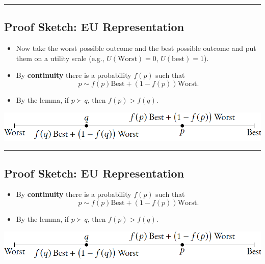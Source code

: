 \documentclass[
  letterpaper,
  DIV=11,
  numbers=noendperiod]{scrartcl}
\providecommand{\tightlist}{%
  \setlength{\itemsep}{0pt}\setlength{\parskip}{0pt}}\usepackage{longtable,booktabs,array}
\begin{document}
\begin{center}\rule{0.5\linewidth}{0.5pt}\end{center}

\subsection{Proof Sketch: EU
Representation}\label{proof-sketch-eu-representation-3}

\begin{itemize}
\tightlist
\item
  Now take the worst possible outcome and the best possible outcome and
  put them on a utility scale (e.g., \(U(\text{Worst}) = 0\),
  \(U(\text{best}) = 1\)).
\item
  By \textbf{continuity} there is a probability \(f(p)\) such that \[ 
  p \sim f(p)\text{Best} + (1-f(p))\text{Worst}. 
  \]
\item
  By the lemma, if \(p\succ q\), then \(f(p) > f(q)\).
\end{itemize}

\includegraphics[width=1\linewidth,height=\textheight,keepaspectratio]{figures/WorstBestPQ.png}

\begin{center}\rule{0.5\linewidth}{0.5pt}\end{center}

\subsection{Proof Sketch: EU
Representation}\label{proof-sketch-eu-representation-4}

\begin{itemize}
\tightlist
\item
  By \textbf{continuity} there is a probability \(f(p)\) such that \[ 
  p \sim f(p)\text{Best} + (1-f(p))\text{Worst}. 
  \]
\item
  By the lemma, if \(p\succ q\), then \(f(p) > f(q)\).
\end{itemize}

\includegraphics[width=1\linewidth,height=\textheight,keepaspectratio]{figures/WorstBestPQ.png}
\end{document}
